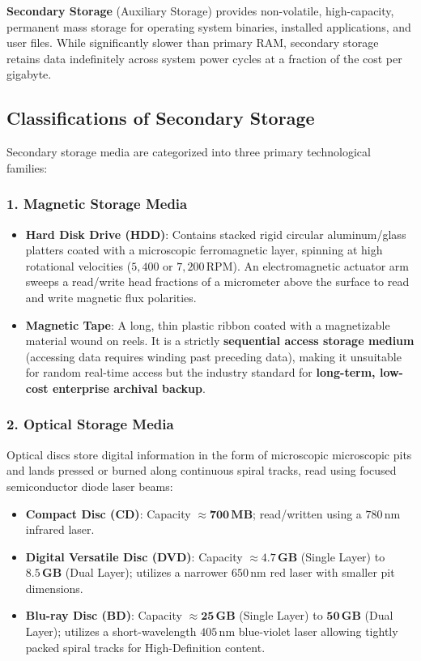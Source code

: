 \textbf{Secondary Storage} (Auxiliary Storage) provides non-volatile, high-capacity, permanent mass storage for operating system binaries, installed applications, and user files. While significantly slower than primary RAM, secondary storage retains data indefinitely across system power cycles at a fraction of the cost per gigabyte.

\subsection{Classifications of Secondary Storage}

Secondary storage media are categorized into three primary technological families:

\subsubsection{1. Magnetic Storage Media}
\begin{itemize}
    \item \textbf{Hard Disk Drive (HDD)}: Contains stacked rigid circular aluminum/glass platters coated with a microscopic ferromagnetic layer, spinning at high rotational velocities ($5{,}400$ or $7{,}200\,\text{RPM}$). An electromagnetic actuator arm sweeps a read/write head fractions of a micrometer above the surface to read and write magnetic flux polarities.
    \item \textbf{Magnetic Tape}: A long, thin plastic ribbon coated with a magnetizable material wound on reels. It is a strictly \textbf{sequential access storage medium} (accessing data requires winding past preceding data), making it unsuitable for random real-time access but the industry standard for \textbf{long-term, low-cost enterprise archival backup}.
\end{itemize}

\subsubsection{2. Optical Storage Media}
Optical discs store digital information in the form of microscopic microscopic pits and lands pressed or burned along continuous spiral tracks, read using focused semiconductor diode laser beams:
\begin{itemize}
    \item \textbf{Compact Disc (CD)}: Capacity $\approx \mathbf{700\,\text{MB}}$; read/written using a $780\,\text{nm}$ infrared laser.
    \item \textbf{Digital Versatile Disc (DVD)}: Capacity $\approx \mathbf{4.7\,\text{GB}}$ (Single Layer) to $\mathbf{8.5\,\text{GB}}$ (Dual Layer); utilizes a narrower $650\,\text{nm}$ red laser with smaller pit dimensions.
    \item \textbf{Blu-ray Disc (BD)}: Capacity $\approx \mathbf{25\,\text{GB}}$ (Single Layer) to $\mathbf{50\,\text{GB}}$ (Dual Layer); utilizes a short-wavelength $405\,\text{nm}$ blue-violet laser allowing tightly packed spiral tracks for High-Definition content.
\end{itemize}

